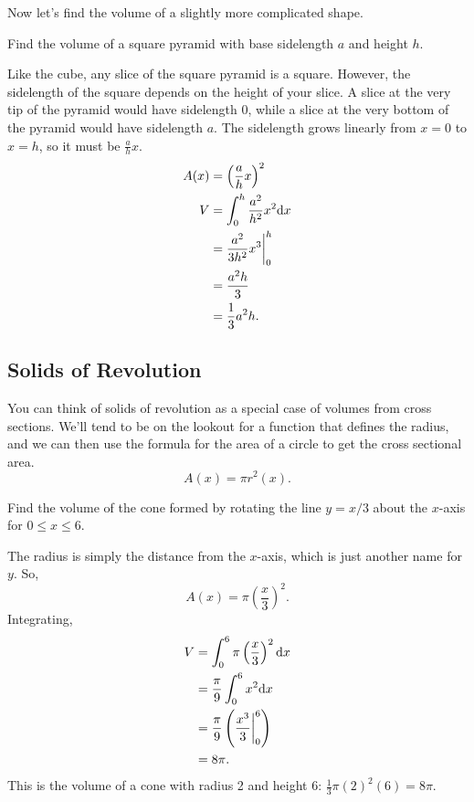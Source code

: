 \noindent
Now let's find the volume of a slightly more complicated shape.
\begin{example}
	Find the volume of a square pyramid with base sidelength $a$ and height $h$.
\end{example}
Like the cube, any slice of the square pyramid is a square.
However, the sidelength of the square depends on the height of your slice.
A slice at the very tip of the pyramid would have sidelength 0, while a slice at the very bottom of the pyramid would have sidelength $a$.
The sidelength grows linearly from $x=0$ to $x=h$, so it must be $\frac{a}{h}x$.
\begin{align*}
	A(x) &= \left(\frac{a}{h}x\right)^2 \\
	V &= \int_{0}^{h}{\frac{a^2}{h^2}x^2\mathrm{d} x} \\
	&= \frac{a^2}{3h^2}x^3 \biggr\rvert_0^h \\
	&= \frac{a^2h}{3} \\
	&= \frac{1}{3}a^2 h.
\end{align*}

\subsection{Solids of Revolution}
You can think of solids of revolution as a special case of volumes from cross sections.
We'll tend to be on the lookout for a function that defines the radius, and we can then use the formula for the area of a circle to get the cross sectional area.
\begin{equation*}
	A(x) = \pi r^2(x).
\end{equation*}

\begin{example}
	Find the volume of the cone formed by rotating the line $y=x/3$ about the $x$-axis for $0 \leq x \leq 6$.
\end{example}
The radius is simply the distance from the $x$-axis, which is just another name for $y$.
So,
\begin{equation*}
	A(x) = \pi \left(\frac{x}{3}\right)^2.
\end{equation*}
\indent
Integrating,
\begin{align*}
	V &= \int_{0}^{6}{\pi\left(\frac{x}{3}\right)^2\mathrm{d} x} \\
	&= \frac{\pi}{9}\int_{0}^{6}{x^2\mathrm{d} x} \\
	&= \frac{\pi}{9}\left(\frac{x^3}{3}\biggr\rvert_0^6\right) \\
	&= 8\pi.
\end{align*}
\indent
This is the volume of a cone with radius 2 and height 6: $\frac{1}{3}\pi(2)^2(6)=8\pi$.

